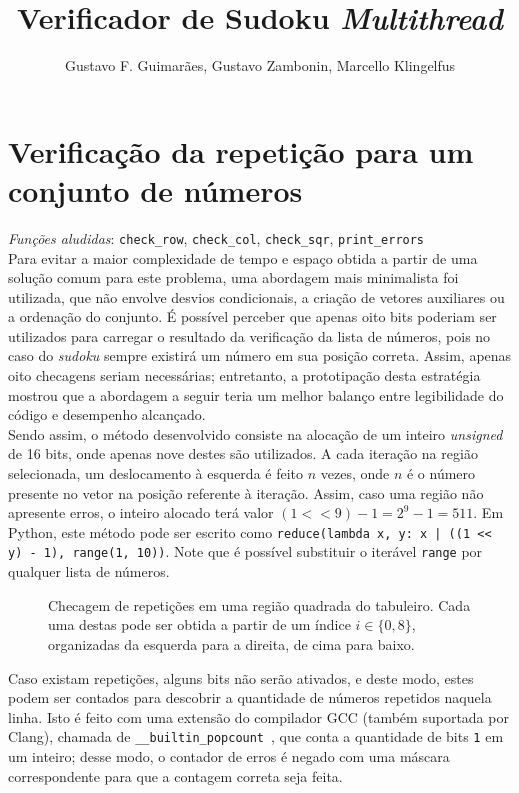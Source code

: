 \documentclass[12pt]{sftex/sftex}
\title{Verificador de Sudoku \emph{Multithread}}
\author{Gustavo F. Guimarães, Gustavo Zambonin, Marcello Klingelfus}
\begin{document}
\maketitle

\section{Verificação da repetição para um conjunto de números}

\emph{Funções aludidas}: \texttt{check\_row}, \texttt{check\_col},
\texttt{check\_sqr}, \texttt{print\_errors} \\

Para evitar a maior complexidade de tempo e espaço obtida a partir de uma
solução comum para este problema, uma abordagem mais minimalista foi utilizada,
que não envolve desvios condicionais, a criação de vetores auxiliares ou a
ordenação do conjunto. É possível perceber que apenas oito bits poderiam ser
utilizados para carregar o resultado da verificação da lista de números, pois
no caso do \emph{sudoku} sempre existirá um número em sua posição correta.
Assim, apenas oito checagens seriam necessárias; entretanto, a prototipação
desta estratégia mostrou que a abordagem a seguir teria um melhor balanço entre
legibilidade do código e desempenho alcançado. \\

Sendo assim, o método desenvolvido consiste na alocação de um inteiro
\emph{unsigned} de 16 bits, onde apenas nove destes são utilizados. A cada
iteração na região selecionada, um deslocamento à esquerda é feito $n$ vezes,
onde $n$ é o número presente no vetor na posição referente à iteração. Assim,
caso uma região não apresente erros, o inteiro alocado terá valor
$(1 << 9) - 1 = 2^9 - 1 = 511$. Em Python, este método pode ser escrito como
\verb!reduce(lambda x, y: x | ((1 << y) - 1), range(1, 10))!.
Note que é possível substituir o iterável \texttt{range} por qualquer lista de
números.

\begin{figure}[htbp]
  
  \caption{Checagem de repetições em uma região quadrada do tabuleiro. Cada
    uma destas pode ser obtida a partir de um índice $i \in \{0, 8\}$,
    organizadas da esquerda para a direita, de cima para baixo.}
\end{figure}

Caso existam repetições, alguns bits não serão ativados, e deste modo, estes
podem ser contados para descobrir a quantidade de números repetidos naquela
linha. Isto é feito com uma extensão do compilador GCC (também suportada por
Clang), chamada de \texttt{\_\_builtin\_popcount}~\cite{gcc}, que conta a
quantidade de bits \texttt{1} em um inteiro; desse modo, o contador de erros é
negado com uma máscara correspondente para que a contagem correta seja feita.
\end{document}
